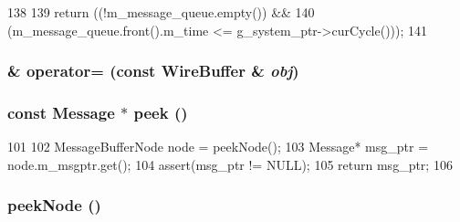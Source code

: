 \begin{DoxyCode}
138 {
139     return ((!m_message_queue.empty()) &&
140             (m_message_queue.front().m_time <= g_system_ptr->curCycle()));
141 }
\end{DoxyCode}
\hypertarget{classWireBuffer_add880f9d0522944b0126f058cc4276b7}{
\subsubsection[{operator=}]{\& operator= (const {\bf WireBuffer} \& {\em obj})}}
\label{classWireBuffer_add880f9d0522944b0126f058cc4276b7}
\hypertarget{classWireBuffer_ab635dc32ebecf260c15d8fbbbb9b21e0}{
\subsubsection[{peek}]{\setlength{\rightskip}{0pt plus 5cm}const {\bf Message} $\ast$ peek ()}}
\label{classWireBuffer_ab635dc32ebecf260c15d8fbbbb9b21e0}



\begin{DoxyCode}
101 {
102     MessageBufferNode node = peekNode();
103     Message* msg_ptr = node.m_msgptr.get();
104     assert(msg_ptr != NULL);
105     return msg_ptr;
106 }
\end{DoxyCode}
\hypertarget{classWireBuffer_a719ec7b793f4cb9336241e7c9a405323}{
\subsubsection[{peekNode}]{ peekNode ()}}
\label{classWireBuffer_a719ec7b793f4cb9336241e7c9a405323}



